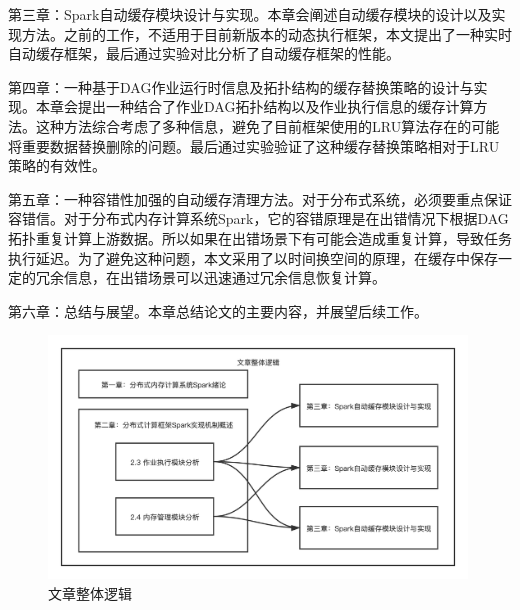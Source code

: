 第三章：Spark自动缓存模块设计与实现。本章会阐述自动缓存模块的设计以及实现方法。之前的工作，不适用于目前新版本的动态执行框架，本文提出了一种实时自动缓存框架，最后通过实验对比分析了自动缓存框架的性能。

第四章：一种基于DAG作业运行时信息及拓扑结构的缓存替换策略的设计与实现。本章会提出一种结合了作业DAG拓扑结构以及作业执行信息的缓存计算方法。这种方法综合考虑了多种信息，避免了目前框架使用的LRU算法存在的可能将重要数据替换删除的问题。最后通过实验验证了这种缓存替换策略相对于LRU策略的有效性。

第五章：一种容错性加强的自动缓存清理方法。对于分布式系统，必须要重点保证容错信。对于分布式内存计算系统Spark，它的容错原理是在出错情况下根据DAG拓扑重复计算上游数据。所以如果在出错场景下有可能会造成重复计算，导致任务执行延迟。为了避免这种问题，本文采用了以时间换空间的原理，在缓存中保存一定的冗余信息，在出错场景可以迅速通过冗余信息恢复计算。

第六章：总结与展望。本章总结论文的主要内容，并展望后续工作。

\begin{figure}
    \centering
    \includegraphics[width=0.99\textwidth]{Img/毕业设计整体逻辑.png}
    \caption{文章整体逻辑}
    \label{fig:paper-logic}
\end{figure}